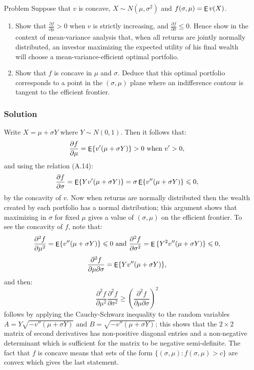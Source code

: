 \documentclass[10pt]{beamer}
\newcommand{\ds}{\displaystyle}
\DeclareMathOperator\expc{{\sf E}}
\theoremstyle{definition}
\begin{document}
\begin{frame}[allowframebreaks]
\begin{enumerate}
  \end{enumerate}
\end{frame}

\begin{frame}{Problem}
  Suppose that $v$ is concave, $X\sim N(\mu,\sigma^2)$ and $f(\sigma, \mu) = \expc v(X)$.
  \begin{enumerate}
    \item Show that $\ds\frac{\partial f}{\partial\mu} > 0$ when $v$ is strictly increasing, and $\ds\frac{\partial f}{\partial\sigma}\leqslant 0$. Hence show in the context of mean-variance analysis that, when all returns are jointly normally distributed, an investor maximizing the expected utility of his final wealth will choose a mean-variance-efficient optimal portfolio.
    \item Show that $f$ is concave in $\mu$ and $\sigma$. Deduce that this optimal portfolio corresponds to a point in the $(\sigma,\mu)$ plane where an indifference contour is tangent to the efficient frontier.
  \end{enumerate}
\end{frame}

\begin{frame}[allowframebreaks]
  \frametitle{Solution}
Write $X = \mu + \sigma Y$ where $Y\sim N(0,1)$. Then it follows that:
\[\frac{\partial f}{\partial \mu} = \expc\{v'(\mu + \sigma Y)\} > 0 \text{ when } v' > 0,\]
and using the relation (A.14):
\[\frac{\partial f}{\partial\sigma} = \expc\{Yv'(\mu + \sigma Y)\} = \sigma \expc\{v''(\mu + \sigma Y)\} \leqslant 0,\]
by the concavity of $v$. Now when returns are normally distributed then the wealth created by each portfolio has a normal distribution; this argument shows that maximizing in $\sigma$ for fixed $\mu$ gives a value of $(\sigma,\mu)$ on the efficient frontier. To see the concavity of $f$, note that:
\[\frac{\partial^2 f}{\partial \mu^2} = \expc\{v''(\mu + \sigma Y)\} \leqslant 0 \text{ and } \frac{\partial^2 f}{\partial \sigma^2} = \expc\,\{Y^2v''(\mu + \sigma Y)\} \leqslant 0,\]
\[\frac{\partial^2 f}{\partial \mu \partial \sigma} = \expc\{Yv''(\mu + \sigma Y)\},\]
and then:
\[\frac{\partial^2 f}{\partial \mu^2}\frac{\partial^2 f}{\partial \sigma^2} \geqslant \left(\frac{\partial^2 f}{\partial \mu \partial \sigma}\right)^2\]
follows by applying the Cauchy-Schwarz inequality to the random variables $A = Y\sqrt{-v''(\mu + \sigma Y)}$ and $B = \sqrt{-v''(\mu + \sigma Y)}$; this shows that the $2 \times 2$ matrix of second derivatives has non-positive diagonal entries and a non-negative determinant which is sufficient for the matrix to be negative semi-definite. The fact that $f$ is concave means that sets of the form $\{(\sigma,\mu) : f(\sigma,\mu) > c\}$ are convex which gives the last statement.
\end{frame}
\end{document}
